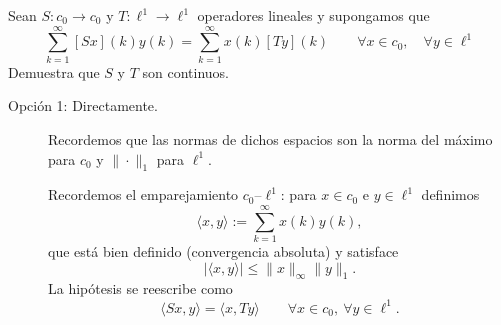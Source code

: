 \documentclass[12pt]{article}
\begin{document}
    \begin{ejercicio}[2 puntos]
        Sean $S:c_0\to c_0$ y $T:\ell^1\to \ell^1$ operadores lineales y supongamos que
        \begin{equation*}
            \sum_{k=1}^{\infty}[Sx](k)y(k) = \sum_{k=1}^{\infty}x(k)[Ty](k) \qquad \forall x\in c_0, \quad \forall y\in \ell^1
        \end{equation*}
        Demuestra que $S$ y $T$ son continuos.

        \begin{description}
            \item[Opción 1: Directamente.]
            
            Recordemos que las normas de dichos espacios son la norma del máximo para $c_0$ y $\|\cdot\|_1$ para $\ell^1$.

            Recordemos el emparejamiento $c_0$--$\ell^1$:
            para $x\in c_0$ e $y\in \ell^1$ definimos
            \begin{equation*}
            \langle x,y\rangle:=\sum_{k=1}^\infty x(k)y(k),
            \end{equation*}
            que está bien definido (convergencia absoluta) y satisface
            \begin{equation*}
            |\langle x,y\rangle|\le \|x\|_\infty\|y\|_1.
            \end{equation*}
            La hipótesis se reescribe como
            \begin{equation*}
            \langle Sx,y\rangle=\langle x,Ty\rangle
            \qquad \forall x\in c_0,\ \forall y\in \ell^1.
            \tag{$\ast$}
            \end{equation*}
            

\end{description}
\end{ejercicio}
\end{document}
